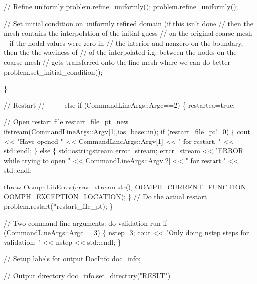 \begin{DoxyCodeInclude}
{{{{{{{   \textcolor{comment}{// Refine uniformly}
   problem.refine\_uniformly();
   problem.refine\_uniformly();

   \textcolor{comment}{// Set initial condition on uniformly refined domain (if this isn't done}
   \textcolor{comment}{// then the mesh contains the interpolation of the initial guess}
   \textcolor{comment}{// on the original coarse mesh -- if the nodal values were zero in}
   \textcolor{comment}{// the interior and nonzero on the boundary, then the the waviness of}
   \textcolor{comment}{// of the interpolated i.g. between the nodes on the coarse mesh}
   \textcolor{comment}{// gets transferred onto the fine mesh where we can do better}
   problem.set\_initial\_condition();

  \}
 
 \textcolor{comment}{// Restart}
 \textcolor{comment}{//--------}
 \textcolor{keywordflow}{else} \textcolor{keywordflow}{if} (CommandLineArgs::Argc==2)
  \{
   restarted=\textcolor{keyword}{true};

   \textcolor{comment}{// Open restart file}
   restart\_file\_pt=\textcolor{keyword}{new} ifstream(CommandLineArgs::Argv[1],ios\_base::in);
   \textcolor{keywordflow}{if} (restart\_file\_pt!=0)
    \{
     cout << \textcolor{stringliteral}{"Have opened "} << CommandLineArgs::Argv[1] << 
      \textcolor{stringliteral}{" for restart. "} << std::endl;
    \}
   \textcolor{keywordflow}{else}
    \{
     std::ostringstream error\_stream;
     error\_stream << \textcolor{stringliteral}{"ERROR while trying to open "} 
                  << CommandLineArgs::Argv[2] 
                  << \textcolor{stringliteral}{" for restart."} << std::endl;

     \textcolor{keywordflow}{throw} OomphLibError(error\_stream.str(),
                         OOMPH\_CURRENT\_FUNCTION,
                         OOMPH\_EXCEPTION\_LOCATION);
    \}
   \textcolor{comment}{// Do the actual restart}
   problem.restart(*restart\_file\_pt);
  \}


 \textcolor{comment}{// Two command line arguments: do validation run}
 \textcolor{keywordflow}{if} (CommandLineArgs::Argc==3)
  \{
    nstep=3;
    cout << \textcolor{stringliteral}{"Only doing nstep steps for validation: "} << nstep << std::endl;
  \}




 \textcolor{comment}{// Setup labels for output}
 DocInfo doc\_info;
 
 \textcolor{comment}{// Output directory}
 doc\_info.set\_directory(\textcolor{stringliteral}{"RESLT"}); 


}}}}}}}
\end{DoxyCodeInclude}
